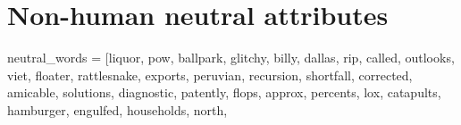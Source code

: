 \documentclass[
  12pt,
]{book}
\newenvironment{Shaded}{\begin{snugshade}}{\end{snugshade}}
\newcommand{\NormalTok}[1]{#1}
\newcommand{\OtherTok}[1]{\textcolor[rgb]{0.56,0.35,0.01}{#1}}
\newcommand{\StringTok}[1]{\textcolor[rgb]{0.31,0.60,0.02}{#1}}
\begin{document}
\normalsize

\hypertarget{non-human-neutral-attributes}{%
\section*{Non-human neutral attributes}\label{non-human-neutral-attributes}}

\vspace{1mm}
\footnotesize

\normalsize

\vspace{1mm}
\scriptsize

\begin{Shaded}
\begin{Highlighting}[]
\NormalTok{neutral\_words }\OtherTok{=}\NormalTok{ [}\StringTok{\textquotesingle{}liquor\textquotesingle{}}\NormalTok{, }\StringTok{\textquotesingle{}pow\textquotesingle{}}\NormalTok{, }\StringTok{\textquotesingle{}ballpark\textquotesingle{}}\NormalTok{, }\StringTok{\textquotesingle{}glitchy\textquotesingle{}}\NormalTok{, }\StringTok{\textquotesingle{}billy\textquotesingle{}}\NormalTok{, }\StringTok{\textquotesingle{}dallas\textquotesingle{}}\NormalTok{, }
                 \StringTok{\textquotesingle{}rip\textquotesingle{}}\NormalTok{, }\StringTok{\textquotesingle{}called\textquotesingle{}}\NormalTok{, }\StringTok{\textquotesingle{}outlooks\textquotesingle{}}\NormalTok{, }\StringTok{\textquotesingle{}viet\textquotesingle{}}\NormalTok{, }\StringTok{\textquotesingle{}floater\textquotesingle{}}\NormalTok{, }\StringTok{\textquotesingle{}rattlesnake\textquotesingle{}}\NormalTok{, }\StringTok{\textquotesingle{}exports\textquotesingle{}}\NormalTok{,}
                 \StringTok{\textquotesingle{}peruvian\textquotesingle{}}\NormalTok{, }\StringTok{\textquotesingle{}recursion\textquotesingle{}}\NormalTok{, }\StringTok{\textquotesingle{}shortfall\textquotesingle{}}\NormalTok{, }\StringTok{\textquotesingle{}corrected\textquotesingle{}}\NormalTok{, }\StringTok{\textquotesingle{}amicable\textquotesingle{}}\NormalTok{,}
                 \StringTok{\textquotesingle{}solutions\textquotesingle{}}\NormalTok{, }\StringTok{\textquotesingle{}diagnostic\textquotesingle{}}\NormalTok{, }\StringTok{\textquotesingle{}patently\textquotesingle{}}\NormalTok{, }\StringTok{\textquotesingle{}flops\textquotesingle{}}\NormalTok{, }\StringTok{\textquotesingle{}approx\textquotesingle{}}\NormalTok{, }\StringTok{\textquotesingle{}percents\textquotesingle{}}\NormalTok{,}
                \StringTok{\textquotesingle{}lox\textquotesingle{}}\NormalTok{, }\StringTok{\textquotesingle{}catapults\textquotesingle{}}\NormalTok{, }\StringTok{\textquotesingle{}hamburger\textquotesingle{}}\NormalTok{, }\StringTok{\textquotesingle{}engulfed\textquotesingle{}}\NormalTok{, }\StringTok{\textquotesingle{}households\textquotesingle{}}\NormalTok{, }\StringTok{\textquotesingle{}north\textquotesingle{}}\NormalTok{,}

\end{Highlighting}
\end{Shaded}
\end{document}
